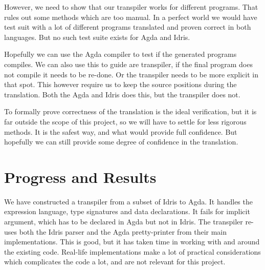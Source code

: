 \documentclass[parskip=half]{scrartcl}
\begin{document}

However, we need to show that our transpiler works for different programs.
That rules out some methods which are too manual.  In a perfect world we would
have test suit with a lot of different programs translated and proven correct in
both languages. But no such test suite exists for Agda and Idris.


Hopefully we can use the Agda compiler to test if the generated programs
compiles. We can also use this to guide are transpiler, if the final
program does not compile it needs to be re-done. Or the transpiler needs to be
more explicit in that spot. This however require us to keep the source
positions during the translation. Both the Agda and Idris does this, but the
transpiler does not.

To formally prove correctness of the translation is the ideal verification, but
it is far outside the scope of this project, so we will have to settle for less
rigorous methods. It is the safest way, and what would provide full confidence.
But hopefully we can still provide some degree of confidence in the
translation.



\section{Progress and Results}

We have constructed a transpiler from a subset of Idris to Agda. It handles the
expression language, type signatures and data declarations.  It fails for
implicit argument, which has to be declared in Agda but not in Idris. The
transpiler re-uses both the Idris parser and the Agda pretty-printer from their
main implementations.  This is good, but it has taken time in working with and
around the existing code.  Real-life implementations make a lot of practical
considerations which complicates the code a lot, and are not relevant for this
project.
\end{document}
